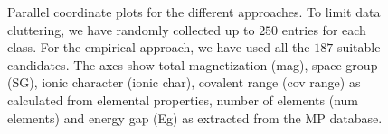 \documentclass[superscriptaddress,unsortedaddress,
 amsmath,amssymb,
 aps,
]{revtex4-2}
\begin{document}
\begin{figure}[t] %
    \centering
    \begin{subfigure}{1\textwidth}
        \centering
        \scalebox{0.85}{}
    \end{subfigure}
    \begin{subfigure}{1\textwidth}
        \centering
          \scalebox{0.85}{}
    \end{subfigure}
    \begin{subfigure}{1\textwidth}
        \centering
          \scalebox{0.85}{}
    \end{subfigure}
    \caption{Parallel coordinate plots for the different approaches. To limit data cluttering, we have randomly collected up to $250$ entries for each class. For the empirical approach, we have used all the $187$ suitable candidates. The axes show total magnetization (mag), space group (SG), ionic character (ionic char), covalent range (cov range) as calculated from elemental properties, number of elements (num elements) and energy gap (Eg) as extracted from the MP database.} 
    \label{fig:parallel-coordinates-approaches}
\end{figure}
\end{document}
